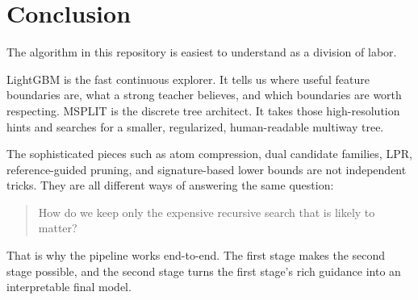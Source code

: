 \documentclass[11pt]{article}
\begin{document}
\section{Conclusion}

The algorithm in this repository is easiest to understand as a division of labor.

LightGBM is the fast continuous explorer. It tells us where useful feature boundaries are, what a strong teacher believes, and which boundaries are worth respecting. MSPLIT is the discrete tree architect. It takes those high-resolution hints and searches for a smaller, regularized, human-readable multiway tree.

The sophisticated pieces such as atom compression, dual candidate families, LPR, reference-guided pruning, and signature-based lower bounds are not independent tricks. They are all different ways of answering the same question:

\begin{quote}
How do we keep only the expensive recursive search that is likely to matter?
\end{quote}

That is why the pipeline works end-to-end. The first stage makes the second stage possible, and the second stage turns the first stage's rich guidance into an interpretable final model.
\end{document}
